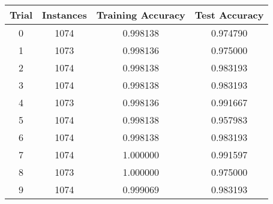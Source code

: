 {\footnotesize
\begin{tabular}{ c | c | c | c }
Trial & Instances & Training Accuracy & Test Accuracy \\
\hline
0 & 1074 & 0.998138 & 0.974790 \\
1 & 1073 & 0.998136 & 0.975000 \\
2 & 1074 & 0.998138 & 0.983193 \\
3 & 1074 & 0.998138 & 0.983193 \\
4 & 1073 & 0.998136 & 0.991667 \\
5 & 1074 & 0.998138 & 0.957983 \\
6 & 1074 & 0.998138 & 0.983193 \\
7 & 1074 & 1.000000 & 0.991597 \\
8 & 1073 & 1.000000 & 0.975000 \\
9 & 1074 & 0.999069 & 0.983193 \\
\end{tabular}
}
